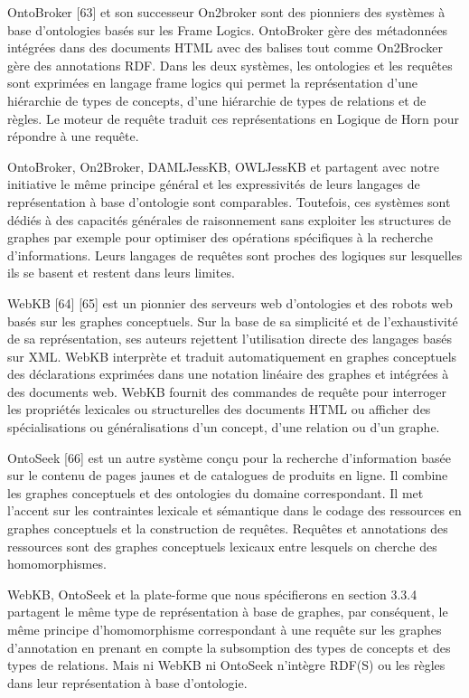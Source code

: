 OntoBroker [63] et son successeur On2broker sont des pionniers des systèmes à base d'ontologies basés sur les Frame Logics. OntoBroker gère des métadonnées intégrées dans des documents HTML avec des balises tout comme On2Brocker gère des annotations RDF. Dans les deux systèmes, les ontologies et les requêtes sont exprimées en langage frame logics qui permet la représentation d'une hiérarchie de types de concepts, d'une hiérarchie de types de relations et de règles. Le moteur de requête traduit ces représentations en Logique de Horn pour répondre à une requête.

OntoBroker, On2Broker, DAMLJessKB, OWLJessKB et partagent avec notre initiative le même principe général et les expressivités de leurs langages de représentation à base d’ontologie sont comparables. Toutefois, ces systèmes sont dédiés à des capacités générales de raisonnement sans exploiter les structures de graphes par exemple pour optimiser des opérations spécifiques à la recherche d'informations. Leurs langages de requêtes sont proches des logiques sur lesquelles ils se basent et restent dans leurs limites.

WebKB [64] [65] est un pionnier des serveurs web d'ontologies et des robots web basés sur les graphes conceptuels. Sur la base de sa simplicité et de l'exhaustivité de sa représentation, ses auteurs rejettent l'utilisation directe des langages basés sur XML. WebKB interprète et traduit automatiquement en graphes conceptuels des déclarations exprimées dans une notation linéaire des graphes et intégrées à des documents web. WebKB fournit des commandes de requête pour interroger les propriétés lexicales ou structurelles des documents HTML ou afficher des spécialisations ou généralisations d'un concept, d'une relation ou d'un graphe.

OntoSeek [66] est un autre système conçu pour la recherche d’information basée sur le contenu de pages jaunes et de catalogues de produits en ligne. Il combine les graphes conceptuels et des ontologies du domaine correspondant. Il met l'accent sur les contraintes lexicale et sémantique dans le codage des ressources en graphes conceptuels et la construction de requêtes. Requêtes et annotations des ressources sont des graphes conceptuels lexicaux entre lesquels on cherche des homomorphismes.

WebKB, OntoSeek et la plate-forme que nous spécifierons en section 3.3.4 partagent le même type de représentation à base de graphes, par conséquent, le même principe d’homomorphisme correspondant à une requête sur les graphes d'annotation en prenant en compte la subsomption des types de concepts et des types de relations. Mais ni WebKB ni OntoSeek n’intègre RDF(S) ou les règles dans leur représentation à base d’ontologie.

